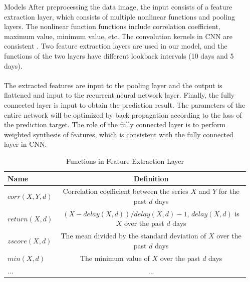 \documentclass[final]{beamer}
\newlength{\sepwidth}
\newlength{\colwidth}
\newcommand{\separatorcolumn}{\begin{column}{\sepwidth}\end{column}}
\begin{document}
\begin{frame}[t]
\begin{columns}[t]
\separatorcolumn

\begin{column}{\colwidth}

  \begin{block}{Models}
    \textmd{After preprocessing the data image, the input consists of a feature extraction layer, which consists of multiple nonlinear functions and pooling layers. The nonlinear function functions include correlation coefficient, maximum value, minimum value, etc. The convolution kernels in CNN are consistent . Two feature extraction layers are used in our model, and the functions of the two layers have different lookback intervals (10 days and 5 days).}
    \\ \hspace*{\fill} \\
    \textmd{The extracted features are input to the pooling layer and the output is flattened and input to the recurrent neural network layer. Finally, the fully connected layer is input to obtain the prediction result. The parameters of the entire network will be optimized by back-propagation according to the loss of the prediction target. The role of the fully connected layer is to perform weighted synthesis of features, which is consistent with the fully connected layer in CNN.}
    \begin{table}
      \centering
      \begin{tabular}{l c}
        \toprule
        \textbf{Name} & \textbf{Definition} \\
        \midrule
        $corr(X, Y, d)$ & Correlation coefficient between the series $X$ and $Y$ for the past $d$ days\\
        $return(X, d)$ & $(X - delay(X, d))/delay(X, d)-1$, $delay(X, d)$ is $X$ over the past $d$ days\\
        $zscore(X, d)$ & The mean divided by the standard deviation of $X$ over the past $d$ days\\
        $min(X, d)$ & The minimum value of $X$ over the past $d$ days \\
        $...$&$...$\\
        \bottomrule
      \end{tabular}
      \caption{Functions in Feature Extraction Layer}
    \end{table}


\end{block}
\end{column}
\end{columns}
\end{frame}
\end{document}
